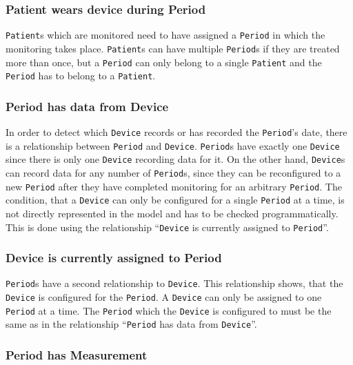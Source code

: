 \documentclass[fontsize=12pt,
               paper=a4,
               twoside=false,
               parskip=half,
               ]{scrartcl}
\begin{document}
\subsubsection{Patient wears device during Period}

\texttt{Patient}s which are monitored need to have assigned a \texttt{Period} in which the monitoring takes place. \texttt{Patient}s can have multiple \texttt{Period}s if they are treated more than once, but a \texttt{Period} can only belong to a single \texttt{Patient} and the \texttt{Period} has to belong to a \texttt{Patient}.


\subsubsection{Period has data from Device}

In order to detect which \texttt{Device} records or has recorded the \texttt{Period}'s date, there is a relationship between \texttt{Period} and \texttt{Device}. \texttt{Period}s have exactly one \texttt{Device} since there is only one \texttt{Device} recording data for it. On the other hand, \texttt{Device}s can record data for any number of \texttt{Period}s, since they can be reconfigured to a new \texttt{Period} after they have completed monitoring for an arbitrary \texttt{Period}. The condition, that a \texttt{Device} can only be configured for a single \texttt{Period} at a time, is not directly represented in the model and has to be checked programmatically. This is done using the relationship \enquote{\texttt{Device} is currently assigned to \texttt{Period}}.


\subsubsection{Device is currently assigned to Period}

\texttt{Period}s have a second relationship to \texttt{Device}. This relationship shows, that the \texttt{Device} is configured for the \texttt{Period}. A \texttt{Device} can only be assigned to one \texttt{Period} at a time. The \texttt{Period} which the \texttt{Device} is configured to must be the same as in the relationship \enquote{\texttt{Period} has data from \texttt{Device}}.


\subsubsection{Period has Measurement}
\end{document}
